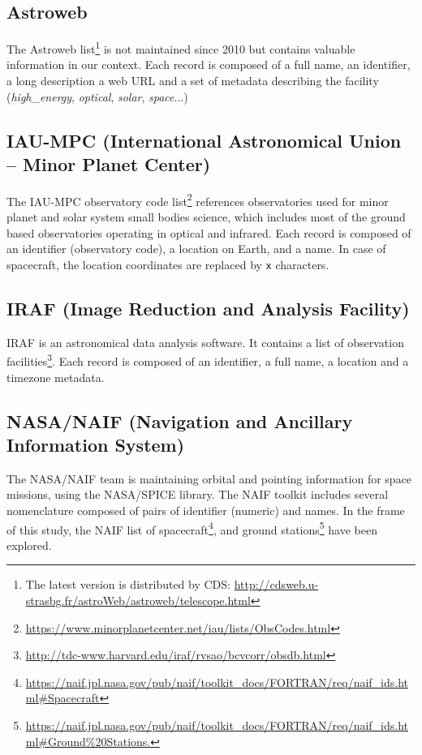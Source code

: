 \documentclass[11pt,a4paper]{ivoa}
\begin{document}
\subsection{Astroweb}
The Astroweb list\footnote{The latest version is distributed by CDS: 
\protect\url{http://cdsweb.u-strasbg.fr/astroWeb/astroweb/telescope.html}} 
is not maintained since 2010 but contains valuable information in our context. 
Each record is composed of a full name, an identifier, a long description
a web URL and a set of metadata describing the facility (\emph{high\_energy}, 
\emph{optical}, \emph{solar}, \emph{space}...)

\subsection{IAU-MPC (International Astronomical Union -- Minor Planet Center)}
The IAU-MPC observatory code list\footnote{\url{https://www.minorplanetcenter.net/iau/lists/ObsCodes.html}}
references observatories used for minor planet and solar system small bodies
science, which includes most of the ground based observatories operating in 
optical and infrared. Each record is composed of an identifier (observatory
code), a location on Earth, and a name. In case of spacecraft, the location
coordinates are replaced by \texttt{x} characters.

\subsection{IRAF (Image Reduction and Analysis Facility)}
IRAF is an astronomical data analysis software. It contains a list of 
observation facilities\footnote{\url{http://tdc-www.harvard.edu/iraf/rvsao/bcvcorr/obsdb.html}}.
Each record is composed of an identifier, a full name, a location and 
a timezone metadata. 

\subsection{NASA/NAIF (Navigation and Ancillary Information System)}
The NASA/NAIF team is maintaining orbital and pointing information for 
space missions, using the NASA/SPICE library. The NAIF toolkit includes
several nomenclature composed of pairs of identifier (numeric) and 
names. In the frame of this study, the NAIF list of spacecraft\footnote{\url{https://naif.jpl.nasa.gov/pub/naif/toolkit_docs/FORTRAN/req/naif_ids.html\#Spacecraft}}, and ground 
stations\footnote{\url{https://naif.jpl.nasa.gov/pub/naif/toolkit_docs/FORTRAN/req/naif_ids.html\#Ground\%20Stations.}}
have been explored.
\end{document}
